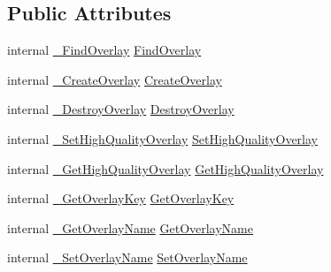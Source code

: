 \subsection*{Public Attributes}
\begin{DoxyCompactItemize}
\item 
internal \mbox{\hyperlink{struct_valve_1_1_v_r_1_1_i_v_r_overlay_a3018bc78389f3d9518de18d91c61f056}{\+\_\+\+Find\+Overlay}} \mbox{\hyperlink{struct_valve_1_1_v_r_1_1_i_v_r_overlay_af463715ed3ec4cb05310d02e970e69d3}{Find\+Overlay}}
\item 
internal \mbox{\hyperlink{struct_valve_1_1_v_r_1_1_i_v_r_overlay_a668f4b8031576ec88d6b713b995592af}{\+\_\+\+Create\+Overlay}} \mbox{\hyperlink{struct_valve_1_1_v_r_1_1_i_v_r_overlay_af7c60bfaea714393469d894b4f72d325}{Create\+Overlay}}
\item 
internal \mbox{\hyperlink{struct_valve_1_1_v_r_1_1_i_v_r_overlay_a7d6cd1a264d3c052ca478ea34a3606ce}{\+\_\+\+Destroy\+Overlay}} \mbox{\hyperlink{struct_valve_1_1_v_r_1_1_i_v_r_overlay_a587dd1b736f60c21539c5dd288cfd411}{Destroy\+Overlay}}
\item 
internal \mbox{\hyperlink{struct_valve_1_1_v_r_1_1_i_v_r_overlay_a659761a1e6723ccc46ed137f72a2421e}{\+\_\+\+Set\+High\+Quality\+Overlay}} \mbox{\hyperlink{struct_valve_1_1_v_r_1_1_i_v_r_overlay_acd9849da5dfb83e83c64d54544bd07dd}{Set\+High\+Quality\+Overlay}}
\item 
internal \mbox{\hyperlink{struct_valve_1_1_v_r_1_1_i_v_r_overlay_a2e6c4ca94aa9cf9f2735457e985f1994}{\+\_\+\+Get\+High\+Quality\+Overlay}} \mbox{\hyperlink{struct_valve_1_1_v_r_1_1_i_v_r_overlay_a01398e41de654a05e29b1e0c2cc940cd}{Get\+High\+Quality\+Overlay}}
\item 
internal \mbox{\hyperlink{struct_valve_1_1_v_r_1_1_i_v_r_overlay_a38178110dc53cc8ae5a125e70ab89203}{\+\_\+\+Get\+Overlay\+Key}} \mbox{\hyperlink{struct_valve_1_1_v_r_1_1_i_v_r_overlay_a4dcb8aac0fe2d94fcf61a5133a57d58d}{Get\+Overlay\+Key}}
\item 
internal \mbox{\hyperlink{struct_valve_1_1_v_r_1_1_i_v_r_overlay_ac81c5dd576fe54477b02122fbad65a6b}{\+\_\+\+Get\+Overlay\+Name}} \mbox{\hyperlink{struct_valve_1_1_v_r_1_1_i_v_r_overlay_a847a70a32987c6c9bd223a9baef66df7}{Get\+Overlay\+Name}}
\item 
internal \mbox{\hyperlink{struct_valve_1_1_v_r_1_1_i_v_r_overlay_a465fcf8a1450d69d7e1e4f26117069fe}{\+\_\+\+Set\+Overlay\+Name}} \mbox{\hyperlink{struct_valve_1_1_v_r_1_1_i_v_r_overlay_abe1b3f3615b5378036f80e868fbf86a7}{Set\+Overlay\+Name}}
\item 

\end{DoxyCompactItemize}
